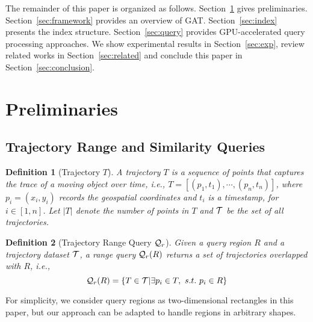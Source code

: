 \documentclass[10pt,conference,letterpaper]{IEEEtran}
\newcommand{\frname}{GAT\xspace }
\newcommand{\rangeq}{{{\cal Q}_r}\xspace}
\newcommand{\alltraj}{{{\cal T}}\xspace}
\newtheorem{definition}{Definition}
\begin{document}
The remainder of this paper is organized as follows. Section~\ref{sec:prelim} gives preliminaries. Section~\ref{sec:framework} provides an overview of \frname. Section~\ref{sec:index} presents the index structure. Section~\ref{sec:query} provides GPU-accelerated query processing approaches. We show experimental results in Section~\ref{sec:exp}, review related works in Section~\ref{sec:related} and conclude this paper in Section~\ref{sec:conclusion}.




\section{Preliminaries}\label{sec:prelim}


\subsection{Trajectory Range and Similarity Queries}

\begin{definition}[Trajectory $T$]\label{def:traj}
	A trajectory $T$ is a sequence of points that captures the trace of a moving object over time, i.e., $T=[(p_1, t_1), \cdots, (p_n, t_n) ]$, where $p_i=(x_i, y_i)$ records the geospatial coordinates and $t_i$ is a timestamp, for $i\in[1,n]$. Let $|T|$ denote the number of points in $T$ and $\alltraj$ be the set of all trajectories.
\end{definition}

\begin{definition}[Trajectory Range Query $\rangeq$]\label{def:range}
	Given a query region $R$ and a trajectory dataset $\alltraj$, a range query $\rangeq(R)$ returns a set of trajectories overlapped with $R$, i.e.,
	\begin{equation}\label{eq:range}
	\small
	\rangeq(R) = \{ T\in \alltraj | \exists p_i\in T, ~s.t. ~p_i\in R\}
	\end{equation}
\end{definition}
For simplicity, we consider query regions as two-dimensional rectangles in this paper, but our approach can be adapted to handle regions in arbitrary shapes.
\end{document}
